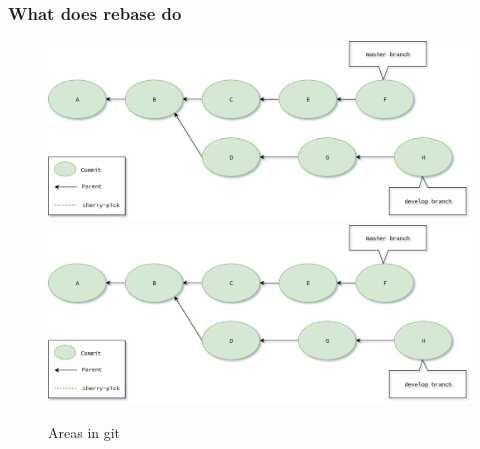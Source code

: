 \begin{frame}[fragile]
    \frametitle{What does rebase do}
    \begin{figure}
        \begin{center}
            {
                \includegraphics[width=1\textwidth,keepaspectratio]{./images/Rebase.png}
            }
            {
                \includegraphics[height=0.75\textheight,keepaspectratio]{./images/Rebase.png}
            }
            \caption{Areas in git}
        \end{center}
    \end{figure}
\end{frame}

